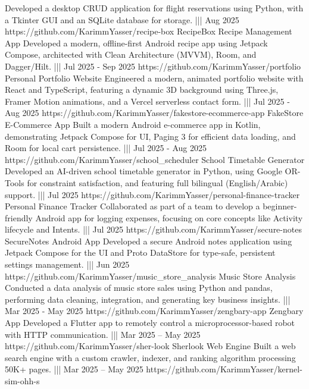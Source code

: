 {    {Developed a desktop CRUD application for flight reservations using Python, with a Tkinter GUI and an SQLite database for storage.}%
    |||
    {Aug 2025}%
    {https://github.com/KarimmYasser/recipe-box}%
    {RecipeBox Recipe Management App}%
    {Developed a modern, offline-first Android recipe app using Jetpack Compose, architected with Clean Architecture (MVVM), Room, and Dagger/Hilt.}%
    |||
    {Jul 2025 - Sep 2025}%
    {https://github.com/KarimmYasser/portfolio}%
    {Personal Portfolio Website}%
    {Engineered a modern, animated portfolio website with React and TypeScript, featuring a dynamic 3D background using Three.js, Framer Motion animations, and a Vercel serverless contact form.}%
    |||
    {Jul 2025 - Aug 2025}%
    {https://github.com/KarimmYasser/fakestore-ecommerce-app}%
    {FakeStore E-Commerce App}%
    {Built a modern Android e-commerce app in Kotlin, demonstrating Jetpack Compose for UI, Paging 3 for efficient data loading, and Room for local cart persistence.}%
    |||
    {Jul 2025 - Aug 2025}%
    {https://github.com/KarimmYasser/school_scheduler}%
    {School Timetable Generator}%
    {Developed an AI-driven school timetable generator in Python, using Google OR-Tools for constraint satisfaction, and featuring full bilingual (English/Arabic) support.}%
    |||
    {Jul 2025}%
    {https://github.com/KarimmYasser/personal-finance-tracker}%
    {Personal Finance Tracker}%
    {Collaborated as part of a team to develop a beginner-friendly Android app for logging expenses, focusing on core concepts like Activity lifecycle and Intents.}%
    |||
    {Jul 2025}%
    {https://github.com/KarimmYasser/secure-notes}%
    {SecureNotes Android App}%
    {Developed a secure Android notes application using Jetpack Compose for the UI and Proto DataStore for type-safe, persistent settings management.}%
    |||
    {Jun 2025}%
    {https://github.com/KarimmYasser/music_store_analysis}%
    {Music Store Analysis}%
    {Conducted a data analysis of music store sales using Python and pandas, performing data cleaning, integration, and generating key business insights.}%
    |||
    {Mar 2025 - May 2025}%
    {https://github.com/KarimmYasser/zengbary-app}%
    {Zengbary App}%
    {Developed a Flutter app to remotely control a microprocessor-based robot with HTTP communication.}%
    |||
    {Mar 2025 – May 2025}%
    {https://github.com/KarimmYasser/sher-look}%
    {Sherlook Web Engine}%
    {Built a web search engine with a custom crawler, indexer, and ranking algorithm processing 50K+ pages.}%
    |||
    {Mar 2025 – May 2025}%
    {https://github.com/KarimmYasser/kernel-sim-ohh-s}%
}
